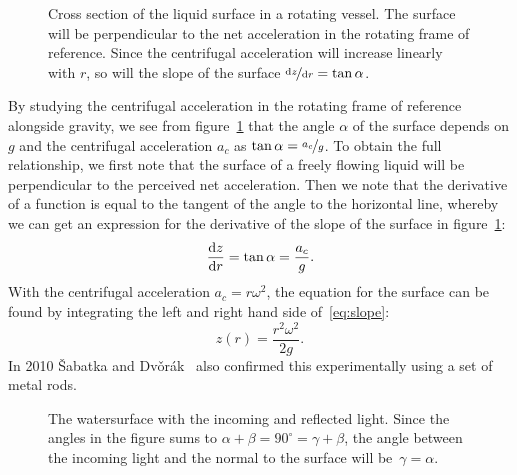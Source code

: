 \documentclass[12pt, a4paper, twocolumn]{article}
\begin{document}
\begin{figure}\centering
\resizebox{7.5cm}{!}{}
\caption{Cross section of the liquid surface in a rotating vessel. The surface will be perpendicular to the net acceleration in the rotating frame of reference. Since the centrifugal acceleration will increase linearly with $r$, so will the slope of the surface ${\nicefrac{\dd{z}}{\dd{r}}=\tan\alpha}$. }
\label{fig:parabola} 
\end{figure}

By studying the centrifugal acceleration in the rotating frame of reference alongside gravity, we see from figure~\ref{fig:parabola} that the angle $\alpha$ of the surface depends on $g$ and the centrifugal acceleration $a_c$ as $\tan\alpha=\nicefrac{a_c}{g}$. To obtain the full relationship, we first note that the surface of a freely flowing liquid will be perpendicular to the perceived net acceleration. Then we note that the derivative of a function is equal to the tangent of the angle to the horizontal line, whereby we can get an expression for the derivative of the slope of the surface in figure~\ref{fig:parabola}:
\begin{equation}\label{eq:slope}
\dv{z}{r} = \tan\alpha = \frac{a_c}{g}.
\end{equation}
With the centrifugal acceleration $a_c=r\omega^2$, the equation for the surface can be found by integrating the left and right hand side of~\eqref{eq:slope}: 
\begin{equation}\label{eq:parabola}
z(r)=\frac{r^2\omega^2}{2g}.
\end{equation}
In 2010 \v{S}abatka and Dv\v{o}rák~\cite{Sabatka2010} also confirmed this experimentally using a set of metal rods. 


\begin{figure}\centering
\resizebox{4cm}{!}{}
\caption{
The watersurface with the incoming and reflected light. Since the angles in the figure sums to $\alpha+\beta= 90^\circ = \gamma+\beta$, the angle between the incoming light and the normal to the surface will be~$\gamma=\alpha$. }
\label{fig:angles} 
\end{figure}
\end{document}
